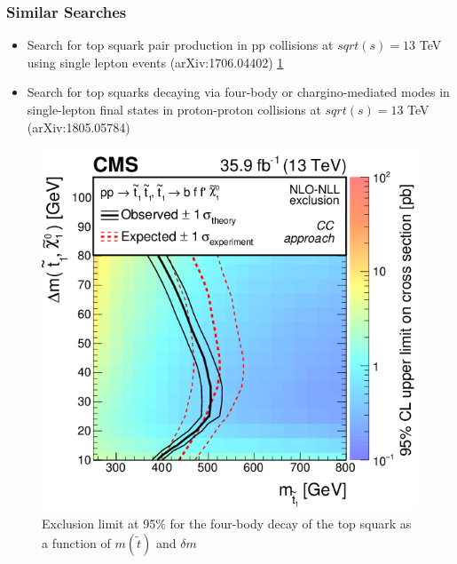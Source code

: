 \documentclass{beamer}
\begin{document}
\begin{frame}
\frametitle{Similar Searches}
{\footnotesize
\begin{itemize}
\item Search for top squark pair production in pp collisions at $sqrt(s) = 13$ TeV using single lepton events (arXiv:1706.04402) \ref{04402}
\item Search for top squarks decaying via four-body or chargino-mediated modes in single-lepton final states in proton-proton collisions at $sqrt(s) = 13$ TeV (arXiv:1805.05784)

\end{itemize}
}
\begin{figure}
\centering
\includegraphics[scale=0.2]{pictures/Figure_007-a} 
\caption{{\scriptsize     Exclusion limit at 95\% for the four-body decay of the top squark as a function of $m(\tilde{t})$ and $\delta m$ } }
\label{04402}
\end{figure}

\end{frame}



\end{document}
